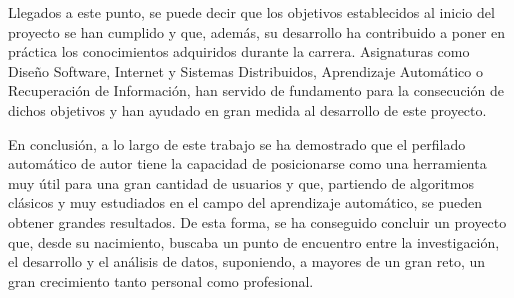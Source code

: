 \bigskip
Llegados a este punto, se puede decir que los objetivos establecidos al inicio del proyecto se han cumplido y que,
además, su desarrollo ha contribuido a poner en práctica los conocimientos adquiridos durante la carrera.
Asignaturas como Diseño Software, Internet y Sistemas Distribuidos, Aprendizaje Automático o Recuperación de Información,
han servido de fundamento para la consecución de dichos objetivos y han ayudado en gran medida al desarrollo de este proyecto.

\bigskip
En conclusión, a lo largo de este trabajo se ha demostrado que el perfilado automático de autor tiene la capacidad de posicionarse
como una herramienta muy útil para una gran cantidad de usuarios y que, partiendo de algoritmos clásicos y muy estudiados en el campo del aprendizaje automático,
se pueden obtener grandes resultados. De esta forma, se ha conseguido concluir un proyecto que, desde su nacimiento, buscaba
un punto de encuentro entre la investigación, el desarrollo y el análisis de datos, suponiendo, a mayores de un gran reto,
un gran crecimiento tanto personal como profesional.

